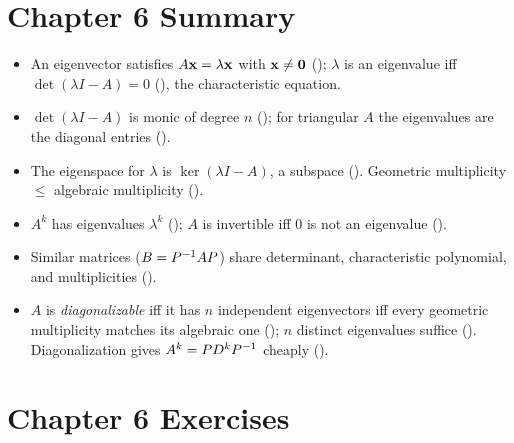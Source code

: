 \section*{Chapter 6 Summary}
\begin{itemize}[leftmargin=1.4em,itemsep=2pt]
\item An eigenvector satisfies $A\mathbf{x}=\lambda\mathbf{x}$ with $\mathbf{x}\neq\mathbf{0}$ (); $\lambda$ is an eigenvalue iff $\det(\lambda I-A)=0$ (), the characteristic equation.
\item $\det(\lambda I-A)$ is monic of degree $n$ (); for triangular $A$ the eigenvalues are the diagonal entries ().
\item The eigenspace for $\lambda$ is $\ker(\lambda I-A)$, a subspace (). Geometric multiplicity $\le$ algebraic multiplicity ().
\item $A^k$ has eigenvalues $\lambda^k$ (); $A$ is invertible iff $0$ is not an eigenvalue ().
\item Similar matrices ($B=P^{-1} AP$) share determinant, characteristic polynomial, and multiplicities ().
\item $A$ is \emph{diagonalizable} iff it has $n$ independent eigenvectors iff every geometric multiplicity matches its algebraic one (); $n$ distinct eigenvalues suffice (). Diagonalization gives $A^k=PD^kP^{-1}$ cheaply ().
\end{itemize}

\section*{Chapter 6 Exercises}

